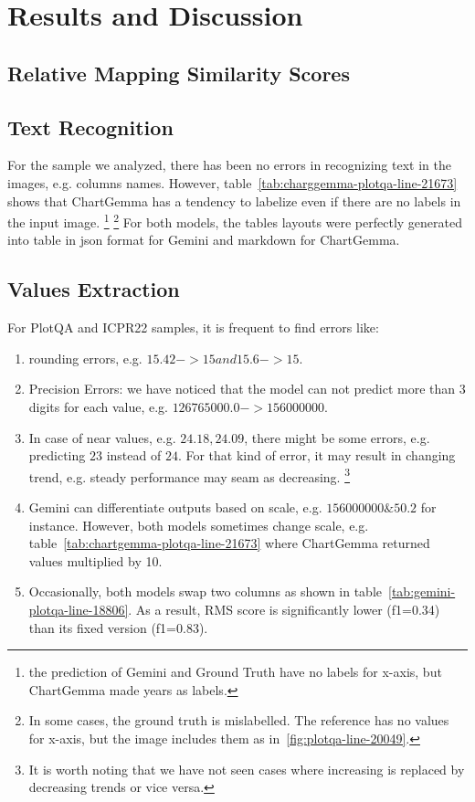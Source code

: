 \documentclass[
	letterpaper, %
]{jdf}
\begin{document}
\section{Results and Discussion}\label{sect:qualitative-analysis}
\subsection{Relative Mapping Similarity Scores}\label{ssect:rms}
\subsection{Text Recognition}\label{ssect:qualitative-text-recognition}
For the sample we analyzed, there has been no errors in recognizing text in the images, e.g. columns names.
However, table~\ref{tab:charggemma-plotqa-line-21673} shows that ChartGemma has a tendency to labelize even if there are no labels in the input image.
\footnote{the prediction of Gemini and Ground Truth have no labels for x-axis, but ChartGemma made years as labels.}
\footnote{In some cases, the ground truth is mislabelled. The reference has no values for x-axis, but the image includes them as in~\ref{fig:plotqa-line-20049}.}
For both models, the tables layouts were perfectly generated into table in json format for Gemini and markdown for ChartGemma.

\subsection{Values Extraction}\label{ssect:values-extraction}
For PlotQA and ICPR22 samples, it is frequent to find errors like:
\begin{enumerate}
     \item rounding errors, e.g. $15.42->15 and 15.6->15$.
     \item Precision Errors: we have noticed that the model can not predict more than 3 digits for each value, e.g. $126765000.0->156000000$.
     \item In case of near values, e.g. $24.18, 24.09$, there might be some errors, e.g. predicting $23$ instead of $24$.
       For that kind of error, it may result in changing trend, e.g. steady performance may seam as decreasing.
       \footnote{It is worth noting that we have not seen cases where increasing is replaced by decreasing trends or vice versa.}
       \item Gemini can differentiate outputs based on scale, e.g. $156000000 \& 50.2$ for instance.
         However, both models sometimes change scale, e.g. table~\ref{tab:chartgemma-plotqa-line-21673} where ChartGemma returned values multiplied by 10.
       \item Occasionally, both models swap two columns as shown in table~\ref{tab:gemini-plotqa-line-18806}.
         As a result, RMS score is significantly lower (f1=0.34) than its fixed version (f1=0.83).
       \end{enumerate}
\end{document}
